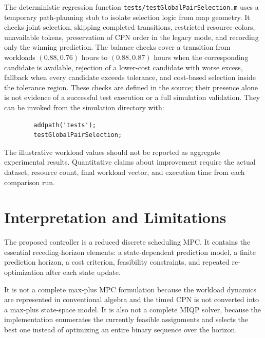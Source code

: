 The deterministic regression function
\texttt{tests/testGlobalPairSelection.m} uses a temporary path-planning stub
to isolate selection logic from map geometry. It checks joint selection,
skipping completed transitions, restricted resource colors, unavailable
tokens, preservation of CPN order in the legacy mode, and recording only the
winning prediction. The balance checks cover a transition from workloads
$(0.88,0.76)$ hours to $(0.88,0.87)$ hours when the corresponding candidate is
available, rejection of a lower-cost candidate with worse excess, fallback
when every candidate exceeds tolerance, and cost-based selection inside the
tolerance region. These checks are defined in the source; their presence
alone is not evidence of a successful test execution or a full simulation
validation. They can be invoked from the simulation directory with:
\begin{small}
	\begin{verbatim}
		addpath('tests');
		testGlobalPairSelection;
	\end{verbatim}
\end{small}
The illustrative workload values should not be reported as aggregate
experimental results. Quantitative claims about improvement require the
actual dataset, resource count, final workload vector, and execution time
from each comparison run.

\section{Interpretation and Limitations}

The proposed controller is a reduced discrete scheduling MPC. It contains
the essential receding-horizon elements: a state-dependent prediction model,
a finite prediction horizon, a cost criterion, feasibility constraints, and
repeated re-optimization after each state update.

It is not a complete max-plus MPC formulation because the workload dynamics
are represented in conventional algebra and the timed CPN is not converted
into a max-plus state-space model. It is also not a complete MIQP solver,
because the implementation enumerates the currently feasible assignments and
selects the best one instead of optimizing an entire binary sequence over the
horizon.

